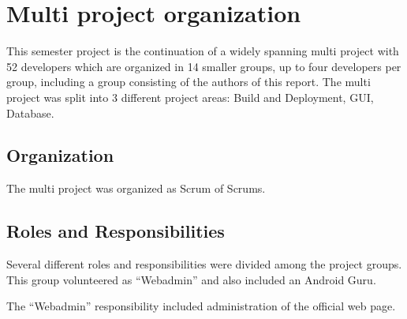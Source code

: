 
\section{Multi project organization}

This semester project is the continuation of a widely spanning multi project with 52 developers which are organized in 14 smaller groups, up to four developers per group, including a group consisting of the authors of this report. The multi project was split into 3 different project areas: Build and Deployment, GUI, Database. 

\subsection{Organization}
The multi project was organized as Scrum of Scrums. 



\subsection{Roles and Responsibilities}
Several different roles and responsibilities were divided among the project groups. This group volunteered as ``Webadmin'' and also included an Android Guru.

The ``Webadmin'' responsibility included administration of the official \giraf web page. 